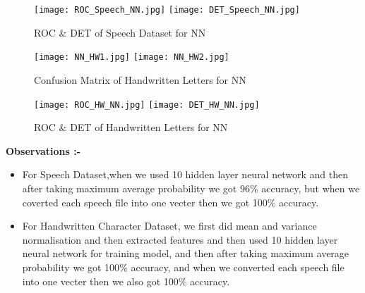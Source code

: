 \documentclass[12pt]{report}
\begin{document}
\begin{figure}[H]
	\centering
	\texttt{[image: ROC\_Speech\_NN.jpg]}
	\texttt{[image: DET\_Speech\_NN.jpg]}
	\caption{ROC \& DET  of Speech Dataset for NN}
\end{figure}


\begin{figure}[H]
	\centering
	\texttt{[image: NN\_HW1.jpg]}
	\texttt{[image: NN\_HW2.jpg]}
	\caption{Confusion Matrix of Handwritten Letters for NN}
\end{figure}

\begin{figure}[H]
	\centering
	\texttt{[image: ROC\_HW\_NN.jpg]}
	\texttt{[image: DET\_HW\_NN.jpg]}
	\caption{ROC \& DET  of Handwritten Letters for NN}
\end{figure}





\noindent
{\bfseries Observations :-}\\
\begin{itemize}
	\item For Speech Dataset,when we used 10 hidden layer neural network and then after taking maximum average probability we got 96$ \% $ accuracy, but when we coverted each speech file into one vecter then we got 100$ \% $ accuracy.\\

\item For Handwritten Character Dataset, we first did mean and variance normalisation and then extracted features and then used 10 hidden layer neural network for training model, and then after taking maximum average probability we got 100$ \% $ accuracy, and when we converted each speech file into one vecter then we also got 100$ \% $ accuracy.\\
\end{itemize}
\end{document}
